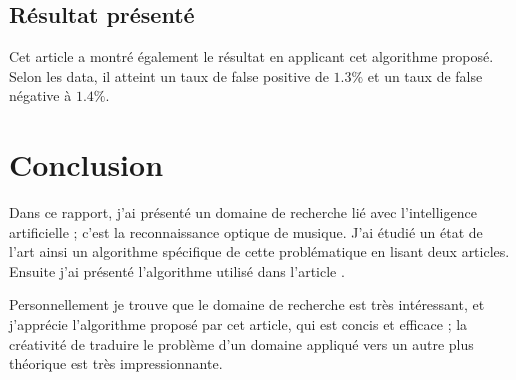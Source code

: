 \documentclass{article}
\begin{document}
\subsection{Résultat présenté}
\par Cet article a montré également le résultat en applicant cet algorithme proposé. Selon les data, il atteint un taux de false positive de $1.3\%$ et un taux de false négative à $1.4\%$.

\section{Conclusion}
\par Dans ce rapport, j'ai présenté un domaine de recherche lié avec l'intelligence artificielle ; c'est la reconnaissance optique de musique. J'ai étudié un état de l'art ainsi un algorithme spécifique de cette problématique en lisant deux articles\cite{dos2009staff}\cite{shatri2020optical}. Ensuite j'ai présenté l'algorithme utilisé dans l'article \cite{dos2009staff}.

\par Personnellement je trouve que le domaine de recherche est très intéressant, et j'apprécie l'algorithme proposé par cet article, qui est concis et efficace ; la créativité de traduire le problème d'un domaine appliqué vers un autre plus théorique est très impressionnante. 

\newpage


\end{document}
